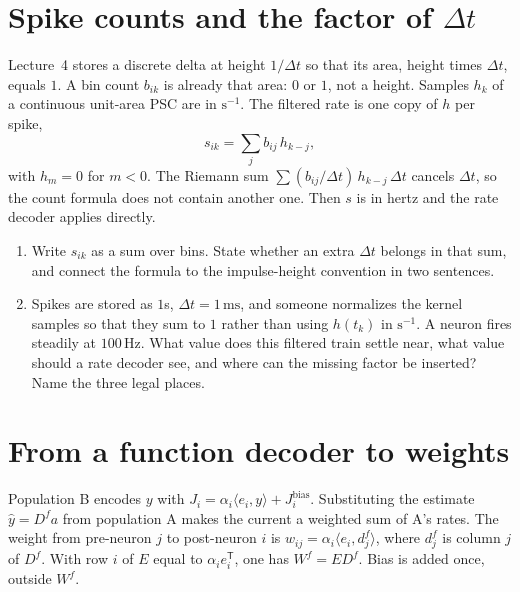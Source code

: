 \documentclass[11pt,letterpaper]{article}
\newcommand{\T}{\mathsf{T}}
\newcommand{\Jb}{J^{\mathrm{bias}}}
\begin{document}
\section{Spike counts and the factor of $\Delta t$}

\begin{idea}
Lecture~4 stores a discrete delta at height $1/\Delta t$ so that its area, height times $\Delta t$, equals $1$. A bin count $b_{ik}$ is already that area: $0$ or $1$, not a height. Samples $h_k$ of a continuous unit-area PSC are in $\mathrm{s}^{-1}$. The filtered rate is one copy of $h$ per spike,
\[
s_{ik} = \sum_j b_{ij}\, h_{k-j},
\]
with $h_m = 0$ for $m < 0$. The Riemann sum $\sum (b_{ij}/\Delta t)\, h_{k-j}\, \Delta t$ cancels $\Delta t$, so the count formula does not contain another one. Then $s$ is in hertz and the rate decoder applies directly.
\end{idea}

\begin{enumerate}
\item Write $s_{ik}$ as a sum over bins. State whether an extra $\Delta t$ belongs in that sum, and connect the formula to the impulse-height convention in two sentences.
\item Spikes are stored as $1$s, $\Delta t = 1\,\mathrm{ms}$, and someone normalizes the kernel samples so that they sum to $1$ rather than using $h(t_k)$ in $\mathrm{s}^{-1}$. A neuron fires steadily at $100\,\mathrm{Hz}$. What value does this filtered train settle near, what value should a rate decoder see, and where can the missing factor be inserted? Name the three legal places.
\end{enumerate}

\section{From a function decoder to weights}

\begin{idea}
Population B encodes $y$ with $J_i = \alpha_i \langle e_i, y \rangle + \Jb_i$. Substituting the estimate $\hat{y} = D^f a$ from population A makes the current a weighted sum of A's rates. The weight from pre-neuron $j$ to post-neuron $i$ is $w_{ij} = \alpha_i \langle e_i, d^f_j \rangle$, where $d^f_j$ is column $j$ of $D^f$. With row $i$ of $E$ equal to $\alpha_i e_i^{\T}$, one has $W^f = ED^f$. Bias is added once, outside $W^f$.
\end{idea}
\end{document}
